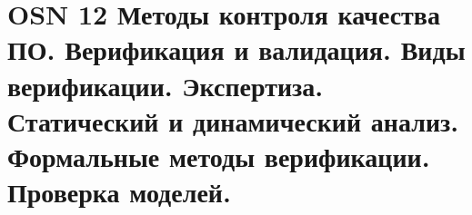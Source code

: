 \section*{OSN 12 Методы контроля качества ПО. Верификация и валидация. Виды верификации. Экспертиза. Статический и динамический анализ. Формальные методы верификации. Проверка моделей.}
